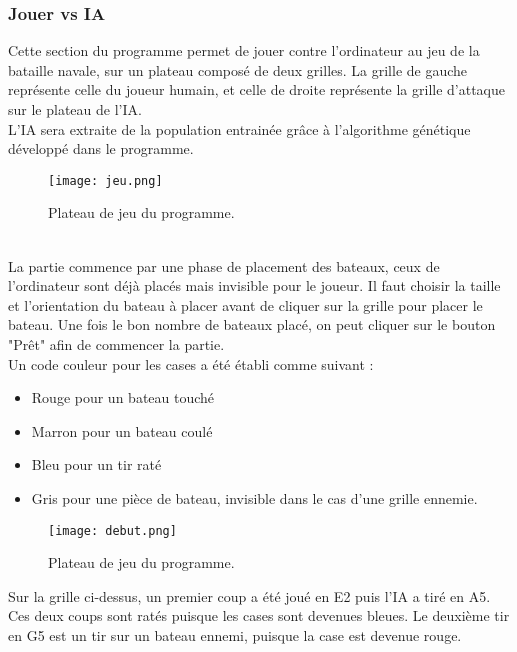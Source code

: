 \documentclass[12pt]{report}
\begin{document}
	\subsubsection{Jouer vs IA}
	Cette section du programme permet de jouer contre l'ordinateur au jeu de la bataille navale, sur un plateau composé de deux grilles. La grille de gauche représente celle du joueur humain, et celle de droite représente la grille d'attaque sur le plateau de l'IA.\\
	L'IA sera extraite de la population entrainée grâce à l'algorithme génétique développé dans le programme.
	\begin{figure}[h]
    	\begin{center}
		\texttt{[image: jeu.png]}
		\caption{Plateau de jeu du programme.}
		\end{center}
	\end{figure}
    \\La partie commence par une phase de placement des bateaux, ceux de l'ordinateur sont déjà placés mais invisible pour le joueur. Il faut choisir la taille et l'orientation du bateau à placer avant de cliquer sur la grille pour placer le bateau. Une fois le bon nombre de bateaux placé, on peut cliquer sur le bouton "Prêt" afin de commencer la partie.\\
    Un code couleur pour les cases a été établi comme suivant :
    \begin{itemize}
    	\item Rouge pour un bateau touché
    	\item Marron pour un bateau coulé
    	\item Bleu pour un tir raté
    	\item Gris pour une pièce de bateau, invisible dans le cas d'une grille ennemie.
    \end{itemize}
    \begin{figure}[h]
    	\begin{center}
		\texttt{[image: debut.png]}
		\caption{Plateau de jeu du programme.}
		\end{center}
	\end{figure}
	\newpage
	\noindent Sur la grille ci-dessus, un premier coup a été joué en E2 puis l'IA a tiré en A5. Ces deux coups sont ratés puisque les cases sont devenues bleues. Le deuxième tir en G5 est un tir sur un bateau ennemi, puisque la case est devenue rouge.
\end{document}
